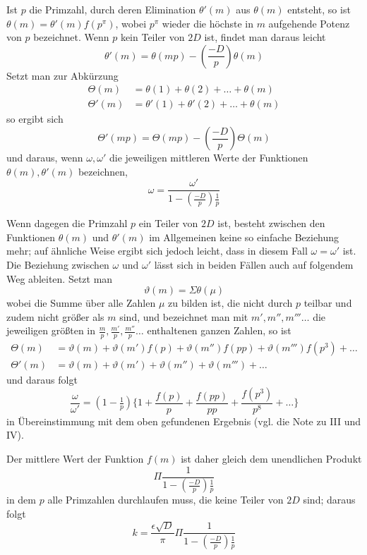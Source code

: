Ist $p$ die Primzahl, durch deren Elimination $\theta'(m)$ aus $\theta(m)$ entsteht, so ist $\theta(m)=\theta'(m)f(p^\pi)$, wobei $p^\pi$ wieder die höchste in $m$ aufgehende Potenz von $p$ bezeichnet. Wenn $p$ kein Teiler von $2D$ ist, findet man daraus leicht
\[
\theta'(m)=\theta(mp)-\left(\frac{-D}p\right)\theta(m)
\]
Setzt man zur Abkürzung
\[
\begin{aligned}
\Theta(m)&=\theta(1)+\theta(2)+\ldots+\theta(m)\\
\Theta'(m)&=\theta'(1)+\theta'(2)+\ldots+\theta(m)
\end{aligned}
\]
so ergibt sich
\[
\Theta'(mp)=\Theta(mp)-\left(\frac{-D}p\right)\Theta(m)
\]
und daraus, wenn $\omega,\omega'$ die jeweiligen mittleren Werte der Funktionen $\theta(m),\theta'(m)$ bezeichnen,
\[
\omega=\frac{\omega'}{1-\left(\frac{-D}p\right)\frac1p}
\]

Wenn dagegen die Primzahl $p$ ein Teiler von $2D$ ist, besteht zwischen den Funktionen $\theta(m)$ und $\theta'(m)$ im Allgemeinen keine so einfache Beziehung mehr; auf ähnliche Weise ergibt sich jedoch leicht, dass in diesem Fall $\omega=\omega'$ ist. Die Beziehung zwischen $\omega$ und $\omega'$ lässt sich in beiden Fällen auch auf folgendem Weg ableiten. Setzt man
\[
\vartheta(m)=\Sigma\theta(\mu)
\]
wobei die Summe über alle Zahlen $\mu$ zu bilden ist, die nicht durch $p$ teilbar und zudem nicht größer als $m$ sind, und bezeichnet man mit $m',m'',m'''\ldots$ die jeweiligen größten in $\frac mp,\frac{m'}p,\frac{m''}p\ldots$ enthaltenen ganzen Zahlen, so ist
\begingroup{}
\[
\begin{aligned}
\Theta(m)&=\vartheta(m)+\vartheta(m')f(p)+\vartheta(m'')f(pp)+\vartheta(m''')f(p^3)+\ldots\\
\Theta'(m)&=\vartheta(m)+\vartheta(m')+\vartheta(m'')+\vartheta(m''')+\ldots
\end{aligned}
\]
\endgroup
und daraus folgt
\[
\frac\omega{\omega'}=(1-\tfrac1p)\{1+\frac{f(p)}p+\frac{f(pp)}{pp}+\frac{f(p^3)}{p^8}+\ldots\}
\]
in Übereinstimmung mit dem oben gefundenen Ergebnis (vgl. die Note zu III und IV).

Der mittlere Wert der Funktion $f(m)$ ist daher gleich dem unendlichen Produkt
\[
\Pi\frac1{1-\left(\frac{-D}p\right)\frac1p}
\]
in dem $p$ alle Primzahlen durchlaufen muss, die keine Teiler von $2D$ sind; daraus folgt
\[
k=\frac{\epsilon\surd D}\pi\Pi\frac1{1-\left(\frac{-D}p\right)\frac1p}
\]

